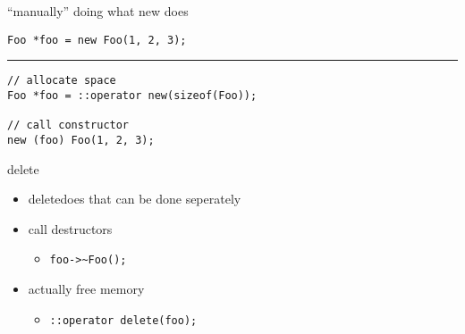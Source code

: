 \begin{frame}[fragile,label=placementNew]{``manually'' doing what new does}
\lstset{language=C++}
\begin{lstlisting}
Foo *foo = new Foo(1, 2, 3);
\end{lstlisting}
\hrule
\begin{lstlisting}
// allocate space
Foo *foo = ::operator new(sizeof(Foo));

// call constructor
new (foo) Foo(1, 2, 3);
\end{lstlisting}
\end{frame}

\begin{frame}[fragile,label=deleteParts]{delete}
\lstset{language=C++}
\begin{itemize}
    \item deletedoes  that can be done seperately
    \vspace{.5cm}
    \item call destructors
        \begin{itemize}
        \item \lstinline|foo->~Foo();|
        \end{itemize}
    \item actually free memory
        \begin{itemize}
        \item \lstinline|::operator delete(foo);|
        \end{itemize}
\end{itemize}
\end{frame}
